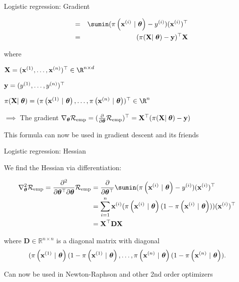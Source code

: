 \documentclass[11pt,compress,t,notes=noshow, xcolor=table]{beamer}
\begin{document}
\begin{frame}{Logistic regression: Gradient}

\begin{align*}
\quad &=& 
\sumin (\pixit - \yi)(\xi)^\top\\
\quad &=& 
(\pi(\mathbf{X}\vert\;\thetav) - \mathbf{y})^\top\mathbf{X}\\
\end{align*}

where

\begin{itemizeM}
\item $\mathbf{X} = (
\xi[1], \dots, 
\xi[n])^\top \in \R^{n\times d}$
\item $\mathbf{y} = (
\yi[1], \dots,\yi[n])^\top$
\item $\pi(\mathbf{X}\vert\;\thetav) = (
\pixit[1], \dots,
\pixit[n]
)^\top \in \R^{n}$
\end{itemizeM}

\vfill

$\implies$ The gradient $\nabla_{\thetav}\riske = (\frac{\partial}{\partial\thetav}\riske)^\top =  \mathbf{X}^\top(\pi(\mathbf{X}\vert\;\thetav) - \mathbf{y})$ 

\vfill

This formula can now be used in gradient descent and its friends

\end{frame}


\begin{frame}{Logistic regression: Hessian}

We find the Hessian via differentiation:

{\small
\begin{align*}
\nabla^2_{\thetav}\riske  = \frac{\partial^2}{\partial{\thetav^\top}\partial\thetav}\riske  & =  
\frac{\partial}{\partial{\thetav^\top}} \sumin (\pixit - \yi)(\xi)^\top\\
& =  
\sum^n_{i=1}\xi (\pixit(1-\pixit))(\xi)^\top\\
& =  
\mathbf{X}^\top \mathbf{D} \mathbf{X}\\
\end{align*}

where $\mathbf{D} \in \mathbb{R}^{n\times n}$ is a diagonal matrix with diagonal 
$$(\pixit[1](1-\pixit[1], \dots, \pixit[n](1-\pixit[n]).$$
}

Can now be used in Newton-Raphson and other 2nd order optimizers


\end{frame}
\end{document}
